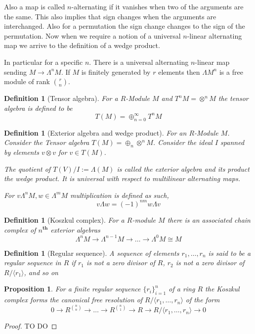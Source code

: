 \documentclass[12pt]{report}
\numberwithin{equation}{section}
\newtheorem{definition}[dummy]{Definition}
\newtheorem{proposition}[dummy]{Proposition}
\begin{document}
		Also a map is called $n$-alternating if it vanishes when two of the arguments are the same. This also implies that sign changes when the arguments are interchanged. Also for a permutation the sign change changes to the sign of the permutation. Now when we require a notion of a universal $n$-linear alternating map we arrive to the definition of a wedge product.
		
		In particular for a specific $n$. There is a universal alternating $n$-linear map sending $M \to \Lambda^n M$. If $M$ is finitely generated by $r$ elements then $\Lambda M^n$ is a free module of rank $\binom{r}{n}$.
		
		\begin{definition}[Tensor algebra]
				For a $R$-Module $M$ and $T^n M = \otimes^n M$ the tensor algebra is defined to be \[ T(M)=\oplus_{n=0}^\infty T^n M \]
			\end{definition}
		
		
		
		\begin{definition}[Exterior algebra and wedge product]
				For an $R$-Module $M$. Consider the Tensor algebra $T(M)=\oplus_n \otimes^n M	$. Consider the ideal $I$ spanned by elements $v \otimes v$ for $v \in T(M)$.
				
				The quotient of $T(V)/I := \Lambda(M) $ is called the exterior algebra and its product the wedge product.	It is universal with respect to multilinear alternating maps.
				
				For $v \Lambda^nM, w \in \Lambda^m M$ multiplication is defined as such,
				\[ v \Lambda w = (-1)^{nm} w \Lambda v\]
			\end{definition}
		
		
		\begin{definition}[Koszkul complex]
				For a $R$-module $M$ there is an associated chain complex of $n^\textbf{th}$ exterior algebras
				\[ \Lambda^n M \to \Lambda^{n-1} M \to \dots \to \Lambda^0 M \cong M \]
			\end{definition}
		
		
		\begin{definition}[Regular sequence]
				A sequence of elements $r_1,\dots,r_n$ is said to be a regular sequence in $R$ if $r_1$ is not a zero divisor of $R$, $r_2$ is not a zero divisor of $R/\langle r_1\rangle $, and so on
			\end{definition}
		\begin{proposition}
				For a finite regular sequence $\{r_i\}_{i=1}^n$ of a ring $R$ the Koszkul complex forms the canonical free resolution of $R/\langle r_1,\dots,r_n\rangle$ of the form
				\[ 0 \to R^{\binom{n}{n}} \to \dots \to R^{\binom{n}{1}} \to R \to R/\langle r_1,\dots, r_n \rangle \to 0\]
			\end{proposition}
		\begin{proof}
				TO DO
			\end{proof}
			
\end{document}
